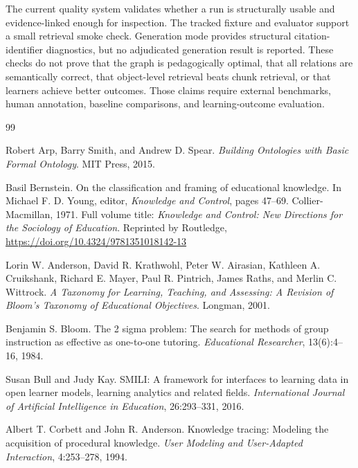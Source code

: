 \documentclass[11pt,letterpaper]{article}
\begin{document}
The current quality system validates whether a run is structurally usable and evidence-linked enough for inspection. The tracked fixture and evaluator support a small retrieval smoke check. Generation mode provides structural citation-identifier diagnostics, but no adjudicated generation result is reported. These checks do not prove that the graph is pedagogically optimal, that all relations are semantically correct, that object-level retrieval beats chunk retrieval, or that learners achieve better outcomes. Those claims require external benchmarks, human annotation, baseline comparisons, and learning-outcome evaluation.

\newpage

\begin{thebibliography}{99}

Robert Arp, Barry Smith, and Andrew D. Spear.
\newblock \emph{Building Ontologies with Basic Formal Ontology}.
\newblock MIT Press, 2015.

Basil Bernstein.
\newblock On the classification and framing of educational knowledge.
\newblock In Michael F. D. Young, editor, \emph{Knowledge and Control}, pages 47--69. Collier-Macmillan, 1971.
\newblock Full volume title: \emph{Knowledge and Control: New Directions for the Sociology of Education}.
\newblock Reprinted by Routledge, \href{https://doi.org/10.4324/9781351018142-13}{https://doi.org/10.4324/9781351018142-13}

Lorin W. Anderson, David R. Krathwohl, Peter W. Airasian, Kathleen A. Cruikshank, Richard E. Mayer, Paul R. Pintrich, James Raths, and Merlin C. Wittrock.
\newblock \emph{A Taxonomy for Learning, Teaching, and Assessing: A Revision of Bloom's Taxonomy of Educational Objectives}.
\newblock Longman, 2001.

Benjamin S. Bloom.
\newblock The 2 sigma problem: The search for methods of group instruction as effective as one-to-one tutoring.
\newblock \emph{Educational Researcher}, 13(6):4--16, 1984.

Susan Bull and Judy Kay.
\newblock SMILI: A framework for interfaces to learning data in open learner models, learning analytics and related fields.
\newblock \emph{International Journal of Artificial Intelligence in Education}, 26:293--331, 2016.

Albert T. Corbett and John R. Anderson.
\newblock Knowledge tracing: Modeling the acquisition of procedural knowledge.
\newblock \emph{User Modeling and User-Adapted Interaction}, 4:253--278, 1994.


\end{thebibliography}
\end{document}
